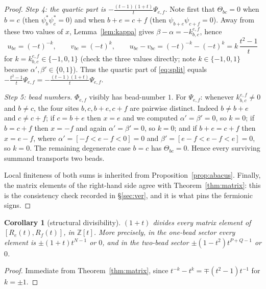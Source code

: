 \documentclass[11pt]{article}
\newtheorem{corollary}[theorem]{Corollary}
\theoremstyle{definition}
\newcommand{\Z}{\mathbb{Z}}
\begin{document}
\begin{proof}
\emph{Step 4: the quartic part is $-\frac{(t-1)(1+t)}{t}\Psi_{e,f}$.}  Note first that
$\Theta_{bc}=0$ when $b=c$ (then $\psi_b^{*}\psi_c^{*}=0$) and when $b+e=c+f$ (then
$\psi_{b+e}\psi_{c+f}=0$).  Away from these two values of $x$, Lemma~\ref{lem:kappa} gives
$\beta-\alpha=-k^{e,f}_{b,c}$, hence
\[
 u_{bc}=(-t)^{-k},\qquad v_{bc}=(-t)^{k},\qquad
 u_{bc}-v_{bc}=(-t)^{-k}-(-t)^{k}=k\,\frac{t^{2}-1}{t}
\]
for $k=k^{e,f}_{b,c}\in\{-1,0,1\}$ (check the three values directly; note
$k\in\{-1,0,1\}$ because $\alpha',\beta'\in\{0,1\}$).  Thus the quartic part of
\eqref{eq:split} equals $-\frac{t^{2}-1}{t}\Psi_{e,f}
=-\frac{(t-1)(1+t)}{t}\Psi_{e,f}$.

\emph{Step 5: bead numbers.}  $\Phi_{e,f}$ visibly has bead-number $1$.  For $\Psi_{e,f}$:
whenever $k^{e,f}_{b,c}\ne0$ and $b\ne c$, the four sites $b,c,b+e,c+f$ are pairwise
distinct.  Indeed $b\ne b+e$ and $c\ne c+f$; if $c=b+e$ then $x=e$ and we computed
$\alpha'=\beta'=0$, so $k=0$; if $b=c+f$ then $x=-f$ and again $\alpha'=\beta'=0$, so
$k=0$; and if $b+e=c+f$ then $x=e-f$, where $\alpha'=[-f<e-f<0]=0$ and
$\beta'=[e-f<e-f<e]=0$, so $k=0$.  The remaining degenerate case $b=c$ has
$\Theta_{bc}=0$.  Hence every surviving summand transports two beads.

Local finiteness of both sums is inherited from Proposition~\ref{prop:abacus}.  Finally,
the matrix elements of the right-hand side agree with Theorem~\ref{thm:matrix}: this is
the consistency check recorded in \S\ref{sec:ver}, and it is what pins the fermionic signs.
\end{proof}

\begin{corollary}[structural divisibility]\label{cor:div}
$(1+t)$ divides every matrix element of $[R_e(t),R_f(t)]$, in
$\Z[t]$.  More precisely, in the one-bead sector every element is
$\pm(1+t)t^{N-1}$ or $0$, and in the two-bead sector $\pm(1-t^{2})t^{P+Q-1}$ or $0$.
\end{corollary}

\begin{proof}
Immediate from Theorem~\ref{thm:matrix}, since $t^{-k}-t^{k}=\mp(t^{2}-1)t^{-1}$ for
$k=\pm1$.
\end{proof}
\end{document}
